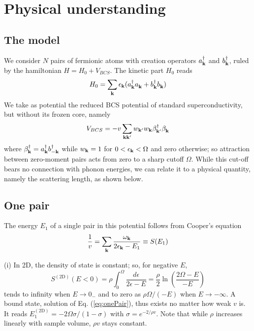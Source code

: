 \documentclass[5p,twocolumn]{elsarticle}
\begin{document}
\section{Physical understanding}
\subsection{The model\label{sec:model}}
We consider $N$ pairs of fermionic atoms with creation operators $a_{\mathbf{k}}^\dagger$ and $b_{\mathbf{k}}^\dagger$, ruled by the hamiltonian
$H=H_{0}+V_{BCS}$. The kinetic part $H_0$ reads 
\begin{equation}
H_0=\sum_{\mathbf{k}}\epsilon_{\mathbf{k}}(a^\dagger_{\mathbf{k}}{}a^{}_{\mathbf{k}}+b^\dagger_{\mathbf{k}}{}b^{}_{\mathbf{k}})
\end{equation}
We take as potential  the reduced BCS potential of standard superconductivity, but without its frozen core, namely
\begin{equation}
V_{BCS}=-v\sum_{\mathbf{k}\mathbf{k}'}w_{\mathbf{k}'}w_{\mathbf{k}}\beta^\dagger_{\mathbf{k}'}{}\beta^{}_{\mathbf{k}}
\label{eq:VBcs}
\end{equation}
 where $\beta^\dagger_{\mathbf{k}}=a^\dagger_{\mathbf{k}}b^\dagger_{-\mathbf{k}}$ while $w_{\mathbf{k}}=1$ for $0<\epsilon_{\mathbf{k}}<\Omega$ and zero otherwise; so attraction between zero-moment pairs acts from zero to a sharp cutoff $\Omega$. While this cut-off bears no connection with phonon energies, we can relate it to a physical quantity, namely the scattering length, as shown below.
 \subsection{One pair\label{sec:onePair}}
The energy $E_1$ of a single pair in this potential follows from Cooper's equation
\begin{equation}
\frac{1}{v}=\sum_{\mathbf{k}}\frac{\omega_{\mathbf{k}}}{2\epsilon_{\mathbf{k}}-E_1}\equiv{}S(E_1)
\label{eq:onePair}
\end{equation}

(i) In 2D, the density of state is constant; so, for negative $E$, 
\begin{equation}
S^{(\text{2D})}(E<0)=\rho\int_0^{\Omega}\frac{d\epsilon}{2\epsilon-E}=\frac{\rho}{2}\ln\left(\frac{2\Omega-E}{-E}\right)
\label{eq:s1pair}
\end{equation}
tends to infinity when $E\rightarrow{}0_{-}$ and to zero as $\rho\Omega/(-E)$ when $E\rightarrow-\infty$. A bound state, solution of Eq. (\ref{eq:onePair}), thus exists no matter how weak $v$ is. It reads
$
E_1^{(\text{2D})}=-2\Omega\sigma/(1-\sigma)
$
with $\sigma=e^{-2/\rho{v}}$. Note that while $\rho$ increases linearly with sample volume, $\rho{v}$ stays constant.
\end{document}
